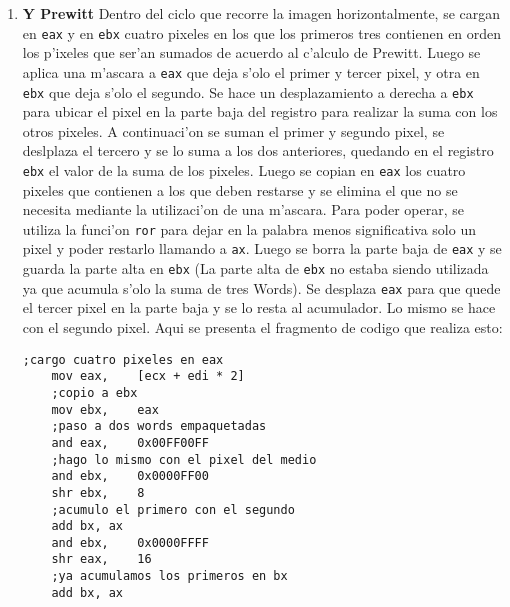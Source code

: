 \documentclass[11pt]{article}
\begin{document}
\begin{enumerate}
\begin{lstlisting}[frame=single]
\end{lstlisting}
\item \textbf{Y Prewitt}
\subitem Dentro del ciclo que recorre la imagen horizontalmente, se cargan en \verb'eax' y en \verb'ebx' cuatro pixeles en los que los primeros tres contienen en orden los p'ixeles que ser'an sumados de acuerdo al c'alculo de Prewitt.
Luego se aplica una m'ascara a \verb'eax' que deja s'olo el primer y tercer pixel, y otra en \verb'ebx' que deja s'olo el segundo. Se hace un desplazamiento a derecha a \verb'ebx' para ubicar el pixel en la parte baja del registro para realizar la suma con los otros pixeles. A continuaci'on se suman el primer y segundo pixel, se deslplaza el tercero y se lo suma a los dos anteriores, quedando en el registro \verb'ebx' el valor de la suma de los pixeles.
Luego se copian en \verb'eax' los cuatro pixeles que contienen a los que deben restarse y se elimina el que no se necesita mediante la utilizaci'on de una m'ascara. Para poder operar, se utiliza la funci'on \verb'ror' para dejar en la palabra menos significativa solo un pixel y poder restarlo llamando a \verb'ax'. Luego se borra la parte baja de \verb'eax' y se guarda la parte alta en \verb'ebx' (La parte alta de \verb'ebx' no estaba siendo utilizada ya que acumula s'olo la suma de tres Words). Se desplaza \verb'eax' para que quede el tercer pixel en la parte baja y se lo resta al acumulador. Lo mismo se hace con el segundo pixel. Aqui se presenta el fragmento de codigo que realiza esto:
\begin{lstlisting}[frame=single]
	;cargo cuatro pixeles en eax
	mov	eax,	[ecx + edi * 2]	
	;copio a ebx
	mov	ebx,	eax		
	;paso a dos words empaquetadas
	and	eax,	0x00FF00FF	
	;hago lo mismo con el pixel del medio
	and	ebx,	0x0000FF00	
	shr	ebx,	8
	;acumulo el primero con el segundo
	add	bx,	ax		
	and	ebx,	0x0000FFFF
	shr	eax,	16
	;ya acumulamos los primeros en bx
	add	bx,	ax		
	

\end{lstlisting}
\end{enumerate}
\end{document}
